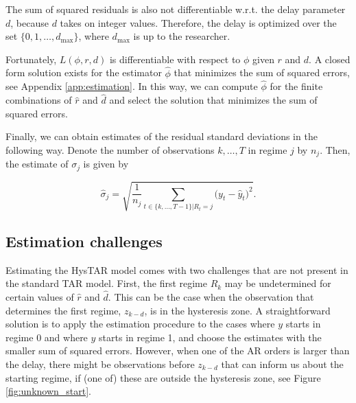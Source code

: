 \documentclass{article}
\begin{document}
The sum of squared residuals is also not differentiable w.r.t. the delay parameter $d$, because $d$ takes on integer values. Therefore, the delay is optimized over the set $\{0, 1, \dots, d_{\max}\}$, where $d_{\max}$ is up to the researcher.

Fortunately, $L(\phi, r, d)$ is differentiable with respect to $\phi$ given $r$ and $d$. A closed form solution exists for the estimator $\hat{\phi}$ that minimizes the sum of squared errors, see Appendix \ref{app:estimation}. 
In this way, we can compute $\hat{\phi}$ for the finite combinations of $\hat{r}$ and $\hat{d}$ and select the solution that minimizes the sum of squared errors.

Finally, we can obtain estimates of the residual standard deviations in the following way. Denote the number of observations $k, \dots, T$ in regime $j$ by $n_j$. Then, the estimate of $\sigma_{j}$ is given by

\begin{equation}
\hat{\sigma}_{j} = \sqrt{\frac{1}{n_j} \sum_{t \in \{k, \dots, T-1\}| R_t = j} \big(y_t - \hat{y}_t \big)^2}.
\end{equation} 

\subsection{Estimation challenges}
Estimating the HysTAR model comes with two challenges that are not present in the standard TAR model.
First, the first regime $R_k$ may be undetermined for certain values of $\hat{r}$ and $\hat{d}$. 
This can be the case when the observation that determines the first regime, $z_{k-d}$, is in the hysteresis zone.
A straightforward solution is to apply the estimation procedure to the cases where $y$ starts in regime 0 and where $y$ starts in regime 1, and choose the estimates with the smaller sum of squared errors.
However, when one of the AR orders is larger than the delay, there might be observations before $z_{k-d}$ that can inform us about the starting regime, if (one of) these are outside the hysteresis zone, see Figure \ref{fig:unknown_start}.
\end{document}
